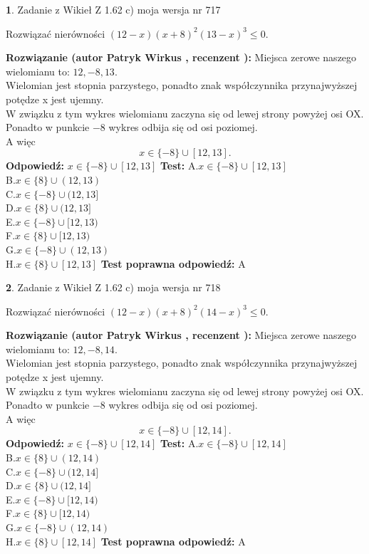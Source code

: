 \documentclass[12pt, a4paper]{article}
\theoremstyle{definition} %
\newtheorem{zad}{}
\newcommand{\zadStart}[1]{\begin{zad}#1\newline}
\newcommand{\zadStop}{\end{zad}}
\newcommand{\rozwStart}[2]{\noindent \textbf{Rozwiązanie (autor #1 , recenzent #2): }\newline}
\newcommand{\rozwStop}{\newline}
\newcommand{\odpStart}{\noindent \textbf{Odpowiedź:}\newline}
\newcommand{\odpStop}{\newline}
\newcommand{\testStart}{\noindent \textbf{Test:}\newline}
\newcommand{\testStop}{\newline}
\newcommand{\kluczStart}{\noindent \textbf{Test poprawna odpowiedź:}\newline}
\newcommand{\kluczStop}{\newline}
\begin{document}
\zadStart{Zadanie z Wikieł Z 1.62 c) moja wersja nr 717}

Rozwiązać nierówności $(12-x)(x+8)^{2}(13-x)^{3}\le0$.
\zadStop
\rozwStart{Patryk Wirkus}{}
Miejsca zerowe naszego wielomianu to: $12, -8, 13$.\\
Wielomian jest stopnia parzystego, ponadto znak współczynnika przy\linebreak najwyższej potędze x jest ujemny.\\ W związku z tym wykres wielomianu zaczyna się od lewej strony powyżej osi OX.\\
Ponadto w punkcie $-8$ wykres odbija się od osi poziomej.\\
A więc $$x \in \{-8\} \cup [12,13].$$
\rozwStop
\odpStart
$x \in \{-8\} \cup [12,13]$
\odpStop
\testStart
A.$x \in \{-8\} \cup [12,13]$\\
B.$x \in \{8\} \cup (12,13)$\\
C.$x \in \{-8\} \cup (12,13]$\\
D.$x \in \{8\} \cup (12,13]$\\
E.$x \in \{-8\} \cup [12,13)$\\
F.$x \in \{8\} \cup [12,13)$\\
G.$x \in \{-8\} \cup (12,13)$\\
H.$x \in \{8\} \cup [12,13]$
\testStop
\kluczStart
A
\kluczStop



\zadStart{Zadanie z Wikieł Z 1.62 c) moja wersja nr 718}

Rozwiązać nierówności $(12-x)(x+8)^{2}(14-x)^{3}\le0$.
\zadStop
\rozwStart{Patryk Wirkus}{}
Miejsca zerowe naszego wielomianu to: $12, -8, 14$.\\
Wielomian jest stopnia parzystego, ponadto znak współczynnika przy\linebreak najwyższej potędze x jest ujemny.\\ W związku z tym wykres wielomianu zaczyna się od lewej strony powyżej osi OX.\\
Ponadto w punkcie $-8$ wykres odbija się od osi poziomej.\\
A więc $$x \in \{-8\} \cup [12,14].$$
\rozwStop
\odpStart
$x \in \{-8\} \cup [12,14]$
\odpStop
\testStart
A.$x \in \{-8\} \cup [12,14]$\\
B.$x \in \{8\} \cup (12,14)$\\
C.$x \in \{-8\} \cup (12,14]$\\
D.$x \in \{8\} \cup (12,14]$\\
E.$x \in \{-8\} \cup [12,14)$\\
F.$x \in \{8\} \cup [12,14)$\\
G.$x \in \{-8\} \cup (12,14)$\\
H.$x \in \{8\} \cup [12,14]$
\testStop
\kluczStart
A
\kluczStop
\end{document}
